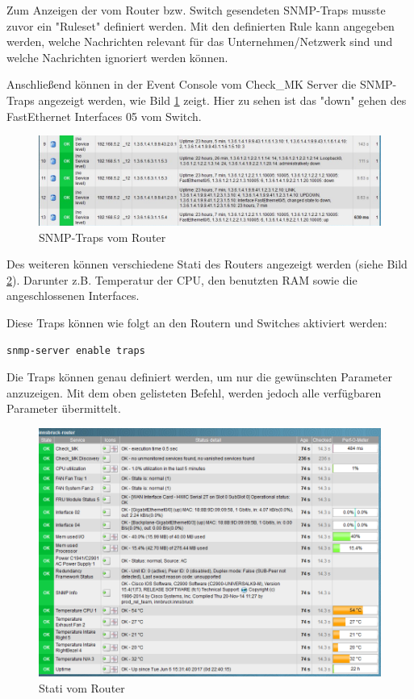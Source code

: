 Zum Anzeigen der vom Router bzw. Switch gesendeten \ac{SNMP}-Traps musste zuvor ein "Ruleset" definiert werden. 
Mit den definierten Rule kann angegeben werden, welche Nachrichten relevant für das Unternehmen/Netzwerk sind und welche Nachrichten ignoriert werden können.


Anschließend können in der Event Console vom Check\_MK Server die \ac{SNMP}-Traps angezeigt werden, wie Bild \ref{img:console} zeigt. Hier zu sehen ist das "down" gehen des FastEthernet Interfaces  05 vom Switch.

\begin{figure}[H]
	\centering
	\includegraphics[scale=0.59]{img/EventConsole_cut.PNG}
	\caption{SNMP-Traps vom Router}
	\label{img:console}
\end{figure}

Des weiteren können verschiedene Stati des Routers angezeigt werden (siehe Bild \ref{img:router_monitoring}). Darunter z.B. Temperatur der CPU, den benutzten RAM sowie die angeschlossenen Interfaces.

Diese Traps können wie folgt an den Routern und Switches aktiviert werden:
\begin{lstlisting}[caption={Traps aktivieren},label={lst:traps},language={}]
 snmp-server enable traps
\end{lstlisting}

Die Traps können genau definiert werden, um nur die gewünschten Parameter anzuzeigen. Mit dem oben gelisteten Befehl, werden jedoch alle verfügbaren Parameter übermittelt.

\begin{figure}[H]
	\centering
	\includegraphics[scale=0.59]{img/checkmk_router.PNG}
	\caption{Stati vom Router}
	\label{img:router_monitoring}
\end{figure}

